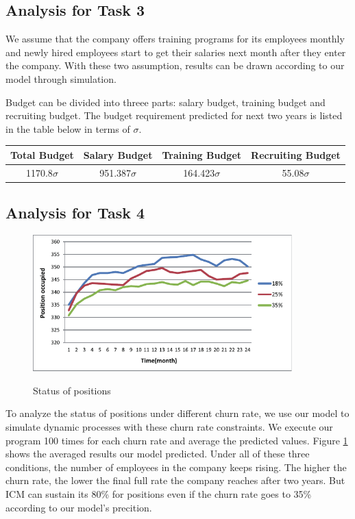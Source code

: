 \documentclass[12pt,a4paper,titlepage]{article}
\begin{document}
\subsection{Analysis for Task 3}
\label{sec:analysis-for-task-3}

We assume that the company offers training programs for its employees monthly and newly hired employees start to get their salaries next month after they enter the company. With these two assumption, results can be drawn according to our model through simulation.

Budget can be divided into threee parts: salary budget, training budget and recruiting budget. The budget requirement predicted for next two years is listed in the table below in terms of $\sigma$.

\begin{tabular}{*{4}{c}}\toprule[2pt]
Total Budget & Salary Budget & Training Budget & Recruiting Budget\\ \midrule
1170.8$\sigma$ & 951.387$\sigma$ & 164.423$\sigma$ & 55.08$\sigma$ \\ \bottomrule[2pt]
\end{tabular}

\subsection{Analysis for Task 4}
\label{sec:analysis-for-task-4}


\begin{figure}[htb]
  \centering
  \includegraphics[width=10cm]{task4_p.pdf}\\
  \caption{Status of positions}\label{t4_p}
\end{figure}

To analyze the status of positions under different churn rate, we use
our model to simulate dynamic processes with these churn rate
constraints. We execute our program 100 times for each churn rate and
average the predicted values. Figure \ref{t4_p} shows the averaged
results our model predicted. Under all of these three conditions, the
number of employees in the company keeps rising. The higher the churn
rate, the lower the final full rate the company reaches after two
years. But ICM can sustain its 80\% for positions even if the churn
rate goes to 35\% according to our model's precition.
\end{document}
